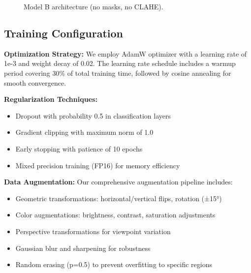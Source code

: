\documentclass[12pt,twocolumn]{article}
\begin{document}
\begin{figure}[htb]
  \centering
  \caption{Model B architecture (no masks, no CLAHE).}
\end{figure}

\subsection{Training Configuration}

\textbf{Optimization Strategy:} We employ AdamW optimizer with a learning rate of 1e-3 and weight decay of 0.02. The learning rate schedule includes a warmup period covering 30\% of total training time, followed by cosine annealing for smooth convergence.

\textbf{Regularization Techniques:}
\begin{itemize}
\item Dropout with probability 0.5 in classification layers
\item Gradient clipping with maximum norm of 1.0
\item Early stopping with patience of 10 epochs
\item Mixed precision training (FP16) for memory efficiency
\end{itemize}

\textbf{Data Augmentation:} Our comprehensive augmentation pipeline includes:
\begin{itemize}
\item Geometric transformations: horizontal/vertical flips, rotation (±15°)
\item Color augmentations: brightness, contrast, saturation adjustments
\item Perspective transformations for viewpoint variation
\item Gaussian blur and sharpening for robustness
\item Random erasing (p=0.5) to prevent overfitting to specific regions
\end{itemize}
\end{document}
